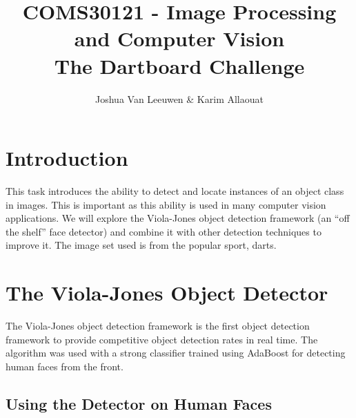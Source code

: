 \documentclass[a4paper]{article}
\title{\vspace{-3em}COMS30121 - Image Processing and Computer Vision\\The Dartboard Challenge\vspace{-0.3em}}
\author{Joshua Van Leeuwen \& Karim Allaouat}
\date{}
\begin{document}
\vspace{-10em}
\maketitle
\vspace{-4em}

\setcounter{section}{-1}
\section*{Introduction}

This task introduces the ability to detect and locate instances of an object
class in images. This is important as this ability is used in many computer
vision applications. We will explore the Viola-Jones object detection
framework (an “off the shelf” face detector) and combine it with other
detection techniques to improve it. The image set used is from the popular
sport, darts.

\section*{The Viola-Jones Object Detector}

The Viola-Jones object detection framework is the first object detection
framework to provide competitive object detection rates in real time. The
algorithm was used with a strong classifier trained using AdaBoost for
detecting human faces from the front.

\subsection*{Using the Detector on Human Faces}
\vspace{-0.7em}
\end{document}
